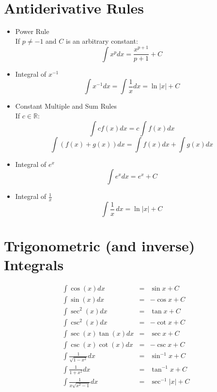 \documentclass{article}
\begin{document}
\section*{Antiderivative Rules}
\begin{itemize}
    \item Power Rule \\
        If $p \neq -1$ and $C$ is an arbitrary constant:
        $$\int{x^p} dx = \frac{x^{p + 1}}{p + 1} + C$$
    \item Integral of $x^{-1}$
        $$\int{x^{-1}}dx = \int{\frac{1}{x}}dx = \ln{|x|} + C$$
    \item Constant Multiple and Sum Rules \\
        If $c \in \mathbb{R}$:
        $$\int{cf(x)}dx = c\int{f(x)}dx$$
        $$\int{\left(f(x) + g(x)\right)}dx = \int{f(x)}dx + \int{g(x)}dx$$
    \item Integral of $e^x$
        $$\int{e^x}dx = e^x + C$$
    \item Integral of $\frac{1}{x}$
        $$\int{\frac{1}{x}}\,dx = \ln{|x|} + C$$
\end{itemize}

\section*{Trigonometric (and inverse) Integrals}
\begin{eqnarray}
    \int{\cos{\left(x\right)}}dx &=& \sin{x} + C \\
    \int{\sin{\left(x\right)}}dx &=& -\cos{x} + C \\
    \int{\sec^2{\left(x\right)}}dx &=& \tan{x} + C \\
    \int{\csc^2{\left(x\right)}}dx &=& -\cot{x} + C \\
    \int{\sec{\left(x\right)}\tan{\left(x\right)}}dx &=& \sec{x} + C \\
    \int{\csc{\left(x\right)}\cot{\left(x\right)}}dx &=& -\csc{x} + C \\
    \int{\frac{1}{\sqrt{1 - x^2}}}dx &=& \sin^{-1}{x} + C \\
    \int{\frac{1}{1 + x^2}}dx &=& \tan^{-1}{x} + C \\
    \int{\frac{1}{x\sqrt{x^2 - 1}}}dx &=& \sec^{-1}{|x|} + C
\end{eqnarray}
\end{document}
